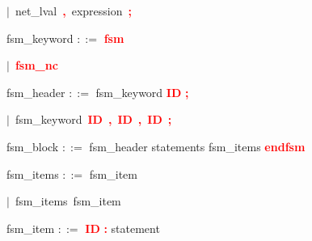 \mbox{$|$ net\_lval \textbf{\textcolor{red}{,}} expression \textbf{\textcolor{red}{;}}}

\vspace{1em}
\noindent
\settowidth{\parindent}{\hspace{4ex}}
fsm\_keyword $::=$\hspace{1ex} \textbf{\textcolor{red}{fsm}}

\mbox{$|$ \textbf{\textcolor{red}{fsm\_nc}}}

\vspace{1em}
\noindent
\settowidth{\parindent}{\hspace{4ex}}
fsm\_header $::=$\hspace{1ex} fsm\_keyword \textbf{\textcolor{red}{ID}} \textbf{\textcolor{red}{;}}

\mbox{$|$ fsm\_keyword \textbf{\textcolor{red}{ID}} \textbf{\textcolor{red}{,}} \textbf{\textcolor{red}{ID}} \textbf{\textcolor{red}{,}} \textbf{\textcolor{red}{ID}} \textbf{\textcolor{red}{;}}}

\vspace{1em}
\noindent
\settowidth{\parindent}{\hspace{4ex}}

\vspace{1em}
\noindent
\settowidth{\parindent}{\hspace{4ex}}
fsm\_block $::=$\hspace{1ex} fsm\_header statements fsm\_items \textbf{\textcolor{red}{endfsm}}

\vspace{1em}
\noindent
\settowidth{\parindent}{\hspace{4ex}}
fsm\_items $::=$\hspace{1ex} fsm\_item

\mbox{$|$ fsm\_items fsm\_item}

\vspace{1em}
\noindent
\settowidth{\parindent}{\hspace{4ex}}

\vspace{1em}
\noindent
\settowidth{\parindent}{\hspace{4ex}}
fsm\_item $::=$\hspace{1ex} \textbf{\textcolor{red}{ID}} \textbf{\textcolor{red}{:}} statement

